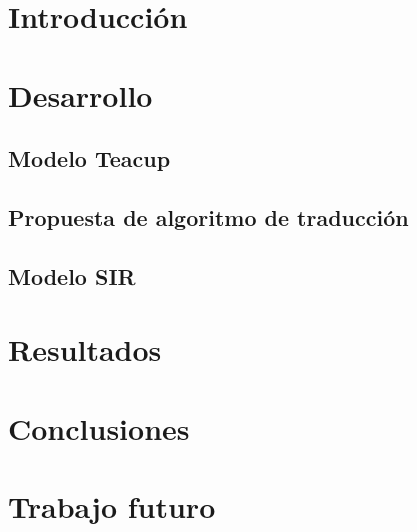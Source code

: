 \documentclass[11pt, a4paper]{article}
\begin{document}

\maketitle
\newpage

\tableofcontents
\newpage

%
\section{Introducción}


\section{Desarrollo}

\subsection{Modelo Teacup}

\subsection{Propuesta de algoritmo de traducción}


\subsection{Modelo SIR}


\section{Resultados}


\section{Conclusiones}


\section{Trabajo futuro}


\clearpage
\addappheadtotoc
\appendix
\appendixpage








\end{document}
